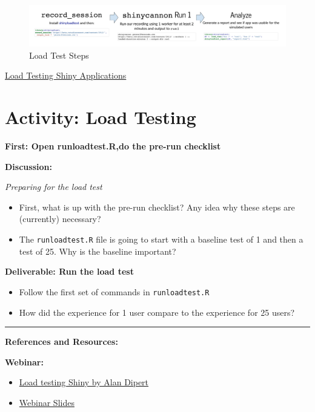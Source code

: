 \documentclass[]{book}
\providecommand{\tightlist}{%
  \setlength{\itemsep}{0pt}\setlength{\parskip}{0pt}}
\theoremstyle{definition}
\theoremstyle{definition}
\theoremstyle{definition}
\theoremstyle{remark}
\begin{document}
\begin{figure}
\centering
\includegraphics{imgs/loadtesting/loadtest-steps.png}
\caption{Load Test Steps}
\end{figure}

\href{https://rstudio.github.io/shinyloadtest/index.html}{Load Testing
Shiny Applications}

\hypertarget{activity-load-testing}{%
\section{Activity: Load Testing}\label{activity-load-testing}}

\textbf{First: Open runloadtest.R,do the pre-run checklist}

\textbf{Discussion:}

\emph{Preparing for the load test}

\begin{itemize}
\tightlist
\item
  First, what is up with the pre-run checklist? Any idea why these steps
  are (currently) necessary?
\item
  The \texttt{runloadtest.R} file is going to start with a baseline test
  of 1 and then a test of 25. Why is the baseline important?
\end{itemize}

\textbf{Deliverable: Run the load test}

\begin{itemize}
\tightlist
\item
  Follow the first set of commands in \texttt{runloadtest.R}
\item
  How did the experience for 1 user compare to the experience for 25
  users?
\end{itemize}

\begin{center}\rule{0.5\linewidth}{\linethickness}\end{center}

\textbf{References and Resources:}

\textbf{Webinar:}

\begin{itemize}
\tightlist
\item
  \href{https://resources.rstudio.com/webinars/load-testing-shiny-alan-dipert}{Load
  testing Shiny by Alan Dipert}
\item
  \href{https://github.com/rstudio/webinars/blob/master/63-shinyloadtest/slides.pdf}{Webinar
  Slides}
\end{itemize}
\end{document}

